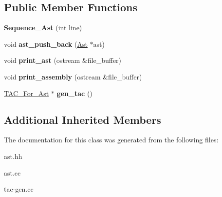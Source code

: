 \subsection*{Public Member Functions}
\begin{DoxyCompactItemize}
\item 
\mbox{\label{classSequence__Ast_a8612ece86ad8132311a63025c9eee8a9}} 
{\bfseries Sequence\+\_\+\+Ast} (int line)
\item 
\mbox{\label{classSequence__Ast_aa43801fc3f6c92489a60c8754ae76d36}} 
void {\bfseries ast\+\_\+push\+\_\+back} (\hyperlink{classAst}{Ast} $\ast$ast)
\item 
\mbox{\label{classSequence__Ast_a91954e294b2c662b50d0736ebcc1a663}} 
void {\bfseries print\+\_\+ast} (ostream \&file\+\_\+buffer)
\item 
\mbox{\label{classSequence__Ast_a951957457b4bffdf57403399961d46b3}} 
void {\bfseries print\+\_\+assembly} (ostream \&file\+\_\+buffer)
\item 
\mbox{\label{classSequence__Ast_aad2ad7222c1cd522e7d85cdf613e770e}} 
\hyperlink{classTAC__For__Ast}{T\+A\+C\+\_\+\+For\+\_\+\+Ast} $\ast$ {\bfseries gen\+\_\+tac} ()
\end{DoxyCompactItemize}
\subsection*{Additional Inherited Members}


The documentation for this class was generated from the following files\+:\begin{DoxyCompactItemize}
\item 
ast.\+hh\item 
ast.\+cc\item 
tac-\/gen.\+cc\end{DoxyCompactItemize}

